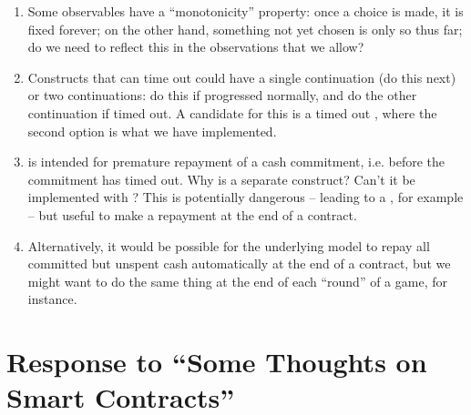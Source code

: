 \documentclass[
      acmsmall
    , screen
    , review=true
  ]{acmart}
\begin{document}
\begin{enumerate}
\item Some observables have a ``monotonicity'' property: once a choice is made, it is fixed forever; on the other hand, something not yet chosen is only so thus far; do we need to reflect this in the observations that we allow?

\item Constructs that can time out could have a single continuation (do this next) or two continuations: do this if progressed normally, and do the other continuation if timed out. A candidate for this is a timed out , where the second option is what we have implemented.
\item {} is intended for premature repayment of a cash commitment, i.e. before the commitment has timed out. Why is  a separate construct? Can't it be implemented with ?%
 This is potentially dangerous -- leading to a , for example -- but useful to make a repayment at the end of a contract. 
\item Alternatively, it would be possible for the underlying model to repay all committed but unspent cash automatically at the end of a contract, but we might want to do the same thing at the end of each ``round'' of  a game, for instance.
\end{enumerate}


\section{Response to ``Some Thoughts on Smart Contracts''}
\end{document}
